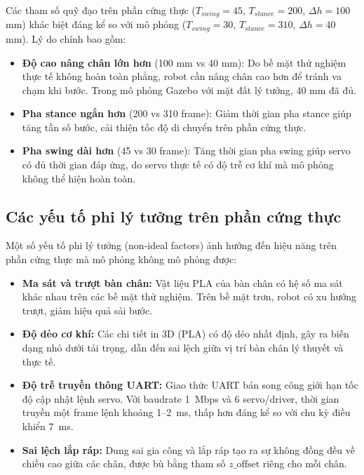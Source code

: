 Các tham số quỹ đạo trên phần cứng thực ($T_{swing} = 45$, $T_{stance} = 200$, $\Delta h = 100$ mm) khác biệt đáng kể so với mô phỏng ($T_{swing} = 30$, $T_{stance} = 310$, $\Delta h = 40$ mm). Lý do chính bao gồm:

\begin{itemize}
    \item \textbf{Độ cao nâng chân lớn hơn} (100 mm vs 40 mm): Do bề mặt thử nghiệm thực tế không hoàn toàn phẳng, robot cần nâng chân cao hơn để tránh va chạm khi bước. Trong mô phỏng Gazebo với mặt đất lý tưởng, 40 mm đã đủ.
    \item \textbf{Pha stance ngắn hơn} (200 vs 310 frame): Giảm thời gian pha stance giúp tăng tần số bước, cải thiện tốc độ di chuyển trên phần cứng thực.
    \item \textbf{Pha swing dài hơn} (45 vs 30 frame): Tăng thời gian pha swing giúp servo có đủ thời gian đáp ứng, do servo thực tế có độ trễ cơ khí mà mô phỏng không thể hiện hoàn toàn.
\end{itemize}

\subsection{Các yếu tố phi lý tưởng trên phần cứng thực}

Một số yếu tố phi lý tưởng (non-ideal factors) ảnh hưởng đến hiệu năng trên phần cứng thực mà mô phỏng không mô phỏng được:

\begin{itemize}
    \item \textbf{Ma sát và trượt bàn chân:} Vật liệu PLA của bàn chân có hệ số ma sát khác nhau trên các bề mặt thử nghiệm. Trên bề mặt trơn, robot có xu hướng trượt, giảm hiệu quả sải bước.
    \item \textbf{Độ dẻo cơ khí:} Các chi tiết in 3D (PLA) có độ dẻo nhất định, gây ra biến dạng nhỏ dưới tải trọng, dẫn đến sai lệch giữa vị trí bàn chân lý thuyết và thực tế.
    \item \textbf{Độ trễ truyền thông UART:} Giao thức UART bán song công giới hạn tốc độ cập nhật lệnh servo. Với baudrate 1~Mbps và 6 servo/driver, thời gian truyền một frame lệnh khoảng 1--2~ms, thấp hơn đáng kể so với chu kỳ điều khiển 7~ms.
    \item \textbf{Sai lệch lắp ráp:} Dung sai gia công và lắp ráp tạo ra sự không đồng đều về chiều cao giữa các chân, được bù bằng tham số $z\_\text{offset}$ riêng cho mỗi chân.
\end{itemize}